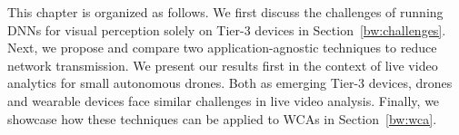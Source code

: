 This chapter is organized as follows. We first discuss the challenges of running
DNNs for visual perception solely on Tier-3 devices in
Section~\ref{bw:challenges}. Next, we propose and compare two
application-agnostic techniques to reduce network transmission. We present our
results first in the context of live video analytics for small autonomous
drones. Both as emerging Tier-3 devices, drones and wearable devices face
similar challenges in live video analysis. Finally, we showcase how these
techniques can be applied to WCAs in Section~\ref{bw:wca}.






